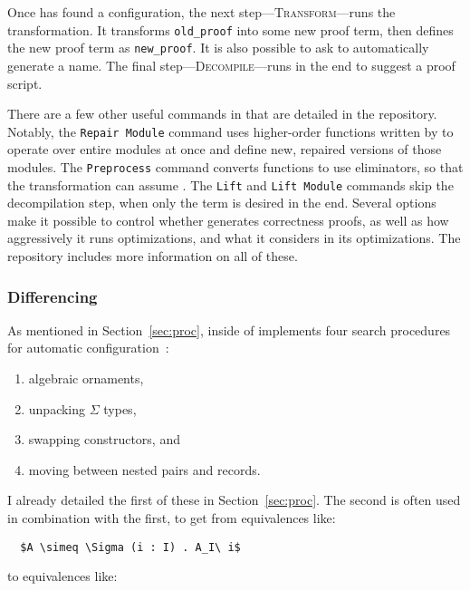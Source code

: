 Once \toolnamec has found a configuration, the next step---\textsc{Transform}---runs the transformation.
It transforms \lstinline{old_proof} into some new proof term, then defines the new proof term as \lstinline{new_proof}.
It is also possible to ask \toolnamec to automatically generate a name. %
The final step---\textsc{Decompile}---runs in the end to suggest a proof script.

There are a few other useful commands in \toolnamec that are detailed in the repository.
Notably, the \lstinline{Repair Module} command uses higher-order functions written by 
to operate over entire modules at once and define new, repaired versions of those modules.
The \lstinline{Preprocess} command converts functions to use eliminators, so that the transformation
can assume .
The \lstinline{Lift} and \lstinline{Lift Module} commands skip the decompilation step,
when only the term is desired in the end.
Several options make it possible to control whether \toolnamec generates correctness proofs,
as well as how aggressively it runs optimizations, and what it considers in its optimizations.
The repository includes more information on all of these.

\subsubsection{Differencing}
\label{sec:pi-details-diff}

As mentioned in Section~\ref{sec:proc},  inside of
\toolnamec implements four search procedures for automatic configuration~\href{https://github.com/uwplse/pumpkin-pi/blob/v2.0.0/plugin/src/automation/lift/liftconfig.ml}{}:

\begin{enumerate}
\item algebraic ornaments,
\item unpacking $\Sigma$ types,
\item swapping constructors, and
\item moving between nested pairs and records.
\end{enumerate}
I already detailed the first of these in Section~\ref{sec:proc}.
The second is often used in combination with the first, to get from equivalences like:

\begin{lstlisting}
  $A \simeq \Sigma (i : I) . A_I\ i$
\end{lstlisting}
to equivalences like:

